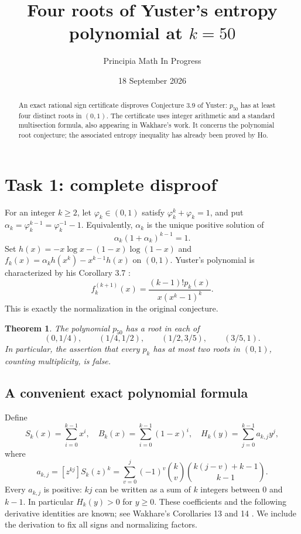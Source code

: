 \documentclass[11pt]{article}
\title{Four roots of Yuster's entropy polynomial at $k=50$}
\author{Principia Math In Progress}
\date{18 September 2026}
\newtheorem{theorem}{Theorem}
\begin{document}
\maketitle
\begin{abstract}
An exact rational sign certificate disproves Conjecture 3.9 of Yuster:
$p_{50}$ has at least four distinct roots in $(0,1)$. The certificate uses
integer arithmetic and a standard multisection formula, also appearing in
Wakhare's work. It concerns the polynomial root conjecture; the associated
entropy inequality has already been proved by Ho.
\end{abstract}

\section*{Task 1: complete disproof}
For an integer $k\ge2$, let $\varphi_k\in(0,1)$ satisfy
$\varphi_k^k+\varphi_k=1$, and put
$\alpha_k=\varphi_k^{k-1}=\varphi_k^{-1}-1$.
Equivalently, $\alpha_k$ is the unique positive solution of
\begin{equation}\label{alpha}
 \alpha_k(1+\alpha_k)^{k-1}=1.
\end{equation}
Set $h(x)=-x\log x-(1-x)\log(1-x)$ and
$f_k(x)=\alpha_k h(x^k)-x^{k-1}h(x)$ on $(0,1)$.
Yuster's polynomial is characterized by his Corollary 3.7 \cite{Y}:
\begin{equation}\label{source}
 f_k^{(k+1)}(x)=\frac{(k-1)!p_k(x)}{x(x^k-1)^k}.
\end{equation}
This is exactly the normalization in the original conjecture.

\begin{theorem}\label{main}
The polynomial $p_{50}$ has a root in each of
\[
 (0,1/4),\qquad(1/4,1/2),\qquad(1/2,3/5),\qquad(3/5,1).
\]
In particular, the assertion that every $p_k$ has at most two roots in
$(0,1)$, counting multiplicity, is false.
\end{theorem}

\subsection*{A convenient exact polynomial formula}
Define
\[
 S_k(x)=\sum_{i=0}^{k-1}x^i,\quad
 B_k(x)=\sum_{i=0}^{k-1}(1-x)^i,\quad
 H_k(y)=\sum_{j=0}^{k-1}a_{k,j}y^j,
\]
where
\begin{equation}\label{coef}
 a_{k,j}=[z^{kj}]S_k(z)^k
 =\sum_{v=0}^{j}(-1)^v\binom{k}{v}
          \binom{k(j-v)+k-1}{k-1}.
\end{equation}
Every $a_{k,j}$ is positive: $kj$ can be written as a sum of $k$ integers
between $0$ and $k-1$. In particular $H_k(y)>0$ for $y\ge0$.
These coefficients and the following derivative identities are known;
see Wakhare's Corollaries 13 and 14 \cite{W}. We include the derivation
to fix all signs and normalizing factors.
\end{document}
